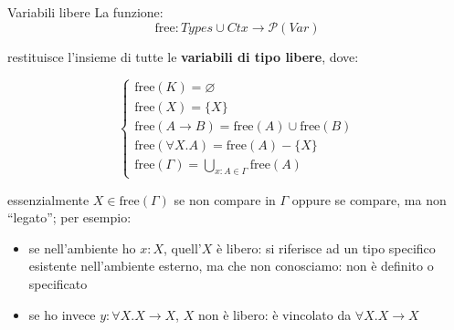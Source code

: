 \documentclass[a4paper,11pt]{report}
\begin{document}
    \begin{defframe}{Variabili libere}{}
        La funzione:
\[
\text{free} : \mathit{Types} \cup \mathit{Ctx} \to \mathcal{P}(\mathit{Var})
\]

restituisce l'insieme di tutte le \textbf{variabili di tipo libere}, dove:

\[
\begin{cases}
\text{free}(K) = \varnothing \\
\text{free}(X) = \{X\} \\
\text{free}(A \to B) = \text{free}(A) \cup \text{free}(B) \\
\text{free}(\forall X.A) = \text{free}(A) - \{X\} \\
\text{free}(\Gamma) = \displaystyle \bigcup_{x:A \in \Gamma} \text{free}(A)
\end{cases}
\]

essenzialmente
\( X \in \text{free}(\Gamma)\) se non compare in \( \Gamma \) oppure se compare, ma non ``legato''; per esempio: 
\begin{itemize}
    \item se nell'ambiente ho \( x:X \), quell'\(X \) è libero: si riferisce ad un tipo specifico esistente nell'ambiente esterno, ma che non conosciamo: non è definito o specificato
    \item se ho invece \( y: \forall X.X\to X \), \(X \) non è libero: è vincolato da \(  \forall X.X\to X\)
\end{itemize}
    \end{defframe}
\end{document}
